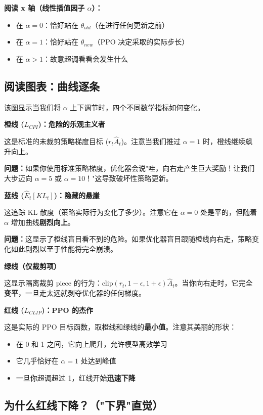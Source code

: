 \documentclass[12pt,a4paper]{article}
\theoremstyle{noteplain}
\theoremstyle{noteexercise}
\begin{document}
\textbf{阅读 x 轴（线性插值因子 $\alpha$）：}
\begin{itemize}
  \setlength{\itemsep}{0.2em}
  \item 在 $\alpha = 0$：恰好站在 $\theta_{old}$（在进行任何更新之前）
  \item 在 $\alpha = 1$：恰好站在 $\theta_{new}$（PPO 决定采取的实际步长）
  \item 在 $\alpha > 1$：故意超调看看会发生什么
\end{itemize}

\subsection{阅读图表：曲线逐条}

该图显示当我们将 $\alpha$ 上下调节时，四个不同数学指标如何变化。

\textbf{橙线 ($L_{CPI}$)：危险的乐观主义者}

这是标准的未裁剪策略梯度目标 ($r_t \hat{A}_t$)。注意当我们推过 $\alpha = 1$ 时，橙线继续飙升向上。

\textbf{问题：}如果你使用标准策略梯度，优化器会说"哇，向右走产生巨大奖励！让我们大步迈向 $\alpha = 5$ 或 $\alpha = 10$！"这导致破坏性策略更新。

\textbf{蓝线 ($\hat{E}_t[KL_t]$)：隐藏的悬崖}

这追踪 KL 散度（策略实际行为变化了多少）。注意它在 $\alpha = 0$ 处是平的，但随着 $\alpha$ 增加曲线\textbf{剧烈向上}。

\textbf{问题：}这显示了橙线盲目看不到的危险。如果优化器盲目跟随橙线向右走，策略变化如此剧烈以至于性能将完全崩溃。

\textbf{绿线（仅裁剪项）}

这显示隔离裁剪 piece 的行为：$\text{clip}(r_t, 1-\epsilon, 1+\epsilon) \hat{A}_t$。当你向右走时，它完全\textbf{变平}，一旦走太远就剥夺优化器的任何梯度。

\textbf{红线 ($L_{CLIP}$)：PPO 的杰作}

这是实际的 PPO 目标函数，取橙线和绿线的\textbf{最小值}。注意其美丽的形状：
\begin{itemize}
  \setlength{\itemsep}{0.2em}
  \item 在 0 和 1 之间，它向上爬升，允许模型高效学习
  \item 它几乎恰好在 $\alpha = 1$ 处达到峰值
  \item 一旦你超调超过 1，红线开始\textbf{迅速下降}
\end{itemize}

\subsection{为什么红线下降？（"下界"直觉）}
\end{document}

